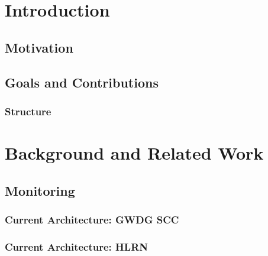 \section{Introduction}
\subsection{Motivation}
\subsection{Goals and Contributions}
\subsubsection{Structure}

\section{Background and Related Work}
\subsection{Monitoring}
\subsubsection{Current Architecture: GWDG SCC}
\subsubsection{Current Architecture: HLRN}
